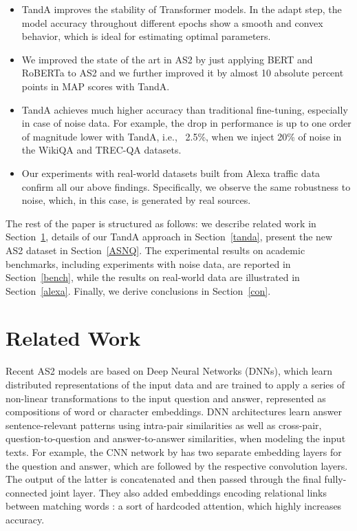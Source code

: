 \documentclass[letterpaper]{article} \usepackage{aaai20}  \usepackage{times}  \usepackage{helvet} \usepackage{courier}  \usepackage[hyphens]{url}  \usepackage{graphicx} \urlstyle{rm} \def\UrlFont{\rm}  \usepackage{graphicx}  \usepackage{todonotes}
\newcommand{\TANDA}{T{\sc and}A}
\begin{document}
\begin{itemize}
\item {\TANDA} improves the stability of Transformer models. In the adapt step, the model accuracy throughout different epochs show a smooth and convex behavior, which is ideal for estimating optimal parameters.
\item We improved the state of the art in AS2 by just applying BERT and RoBERTa to AS2 and we further improved it by almost 10 absolute percent points in MAP scores with {\TANDA}.
\item {\TANDA} achieves much higher accuracy than traditional fine-tuning, especially in case of noise data. For example, the drop in performance is up to one order of magnitude lower with {\TANDA}, i.e., ~2.5\%, when we inject 20\% of noise in the WikiQA and TREC-QA datasets.
\item Our experiments with real-world datasets built from Alexa traffic data confirm all our above findings. Specifically, we observe the same robustness to noise, which, in this case, is generated by real sources.
\end{itemize} 












The rest of the paper is structured as follows: we describe related work in Section~\ref{relwork}, details of our {\TANDA} approach in Section~\ref{tanda}, present the new AS2 dataset in Section~\ref{ASNQ}. The experimental results on academic benchmarks, including experiments with noise data, are reported in Section~\ref{bench}, while the results on real-world data are illustrated in Section~\ref{alexa}. Finally, we derive conclusions in Section~\ref{con}.

\section{Related Work}
\label{relwork}
Recent AS2 models are based on Deep Neural Networks (DNNs), which learn distributed representations of the input data and are trained to apply a series of non-linear transformations to the input question and answer, represented as compositions of word or character embeddings. DNN architectures learn answer sentence-relevant patterns using intra-pair similarities as well as cross-pair, question-to-question and answer-to-answer similarities, when modeling the input texts. For example, the CNN network by \citeauthor{Severyn:2015:LRS:2766462.2767738}
has two separate embedding layers for the question and answer, which are followed by the respective convolution layers. The output of the latter is concatenated and then passed through the final fully-connected joint layer. They also added embeddings encoding relational links between matching words \cite{DBLP:journals/corr/SeverynM16}: a sort of hardcoded attention, which highly increases  accuracy.
\end{document}
